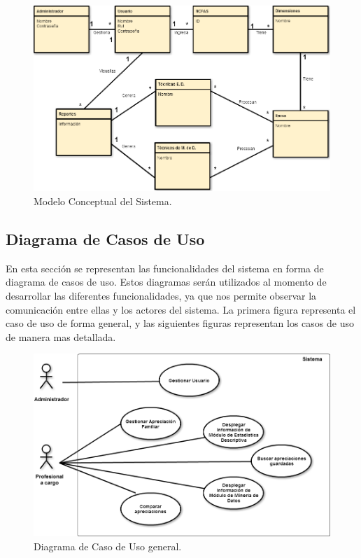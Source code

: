 \begin{figure}[htb]
	\centering
	\label{Figura10}
	\begin{center}
		\includegraphics[scale=0.4]{imagenes/Database.png}
	\end{center}
	\caption{Modelo Conceptual del Sistema.}
\end{figure}

\clearpage 	
\newpage

\subsection{Diagrama de Casos de Uso}

En esta sección se representan las funcionalidades del sistema en forma de diagrama de casos de uso. Estos diagramas serán utilizados al momento de desarrollar las diferentes funcionalidades, ya que nos permite observar la comunicación entre ellas y los actores del sistema. La primera figura representa el caso de uso de forma general, y las siguientes figuras representan los casos de uso de manera mas detallada.

\begin{figure}[htb]
	\label{Figura11}
	\begin{center}
		\includegraphics[scale=0.4]{imagenes/diagramacdu.png}
	\end{center}
	\caption{Diagrama de Caso de Uso general.}
\end{figure}

